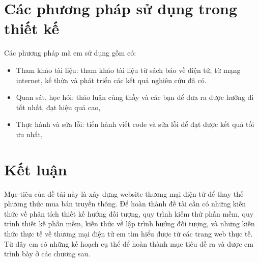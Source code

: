 \section{Các phương pháp sử dụng trong thiết kế}
Các phương pháp mà em sử dụng gồm có:
\begin{itemize}
\item   Tham khảo tài liệu: tham khảo tài liệu từ sách báo về điện tử, từ mạng internet, kế thừa và phát triển các kết quả nghiên cứu đã có.
\item   Quan sát, học hỏi: thảo luận cùng thầy và các bạn để đưa ra được hướng đi tốt nhất, đạt hiệu quả cao,
\item   Thực hành và sửa lỗi: tiến hành viết code và sửa lỗi để đạt được kết quả tối ưu nhất,
\end{itemize}\par
\section{Kết luận}
Mục tiêu của đề tài này là xây dựng website thương mại điện tử để thay thế phương thức mua bán truyền thông. Để hoàn thành đề tài cần có  những kiến thức về phân tích thiết kế hướng đối tượng, quy trình kiếm thử phần mềm, quy trình thiết kế phần mềm, kiến thức về lập trình hướng đối tượng, và những kiến thức thực tế về thương mại điện tử em tìm hiểu được từ các trang web thực tế. Từ đây em có những kế hoạch cụ thể để hoàn thành mục tiêu đề ra và được em trình bày ở các chương sau.

